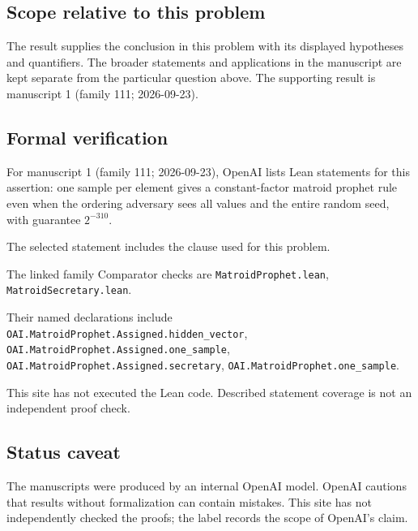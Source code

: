 \documentclass[11pt]{article}
\begin{document}
\subsection{Scope relative to this problem}
The result supplies the conclusion in this problem with its displayed hypotheses and quantifiers. The broader statements and applications in the manuscript are kept separate from the particular question above. The supporting result is manuscript 1 (family 111; 2026-09-23).

\subsection{Formal verification}
For manuscript 1 (family 111; 2026-09-23), OpenAI lists Lean statements for this assertion: one sample per element gives a constant-factor matroid prophet rule even when the ordering adversary sees all values and the entire random seed, with guarantee $2^{-310}$.

The selected statement includes the clause used for this problem.

The linked family Comparator checks are \texttt{MatroidProphet.lean}, \texttt{MatroidSecretary.lean}.

Their named declarations include \texttt{OAI.MatroidProphet.Assigned.hidden\_vector}, \texttt{OAI.MatroidProphet.Assigned.one\_sample}, \texttt{OAI.MatroidProphet.Assigned.secretary}, \texttt{OAI.MatroidProphet.one\_sample}.

This site has not executed the Lean code. Described statement coverage is not an independent proof check.

\subsection{Status caveat}
The manuscripts were produced by an internal OpenAI model. OpenAI cautions that results without formalization can contain mistakes. This site has not independently checked the proofs; the label records the scope of OpenAI's claim.
\end{document}

